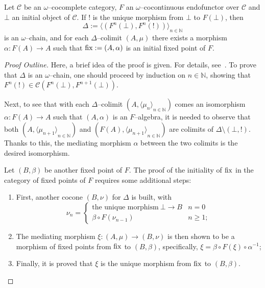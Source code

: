 \begin{thm}\label{thm:init}
  Let \(\mathcal{C}\) be an \(\omega\)--cocomplete category, \(F\) an \(\omega{}\)--cocontinuous endofunctor over \(\mathcal{C}\) and \(\bot{}\) an initial object of \(\mathcal{C}\). %
  If \(!{}\) is the unique morphism from \(\bot{}\) to \(F(\bot{})\), then
  \begin{equation}
    \Delta := {\langle(F^n(\bot),F^n(!))\rangle}_{n \in \mathbb{N}}
  \end{equation}
  is an \(\omega{}\)--chain, and for each \(\Delta\)--colimit \((A,\mu)\) there exists a morphism \(\alpha \colon F(A) \to A\) such that \(\operatorname{fix} := (A,\alpha)\) is an initial fixed point of \(F\). %
\end{thm}
\begin{proof}[Proof Outline]
  Here, a brief idea of the proof is given. For details, see~\cite{Hemerik1988}.
  To prove that \(\Delta{}\) is an \(\omega{}\)--chain, one should proceed by induction on \(n \in \mathbb{N}\), showing that \(F^n(!) \in \mathcal{C}(F^n(\bot),F^{n+1}(\bot))\).

  Next, to see that with each \(\Delta\)--colimit \((A,{\langle\mu_n \rangle}_{n\in\mathbb{N}})\) comes an isomorphism \(\alpha \colon F(A) \to A\) such that \((A,\alpha)\) is an \(F\)--algebra, it is needed to observe that both \((A,{\langle \mu_{n+1} \rangle}_{n\in\mathbb{N}})\) and \((F(A),{\langle\mu_{n+1} \rangle}_{n\in\mathbb{N}})\) are colimits of \(\Delta \setminus (\bot,!)\).
  Thanks to this, the mediating morphism \(\alpha{}\) between the two colimits is the desired isomorphism.

  Let \((B,\beta)\) be another fixed point of \(F\). The proof of the initiality of \(\operatorname{fix}\) in the category of fixed points of \(F\) requires some additional steps:
  \begin{enumerate}
    \item First, another cocone \((B,\nu)\) for \(\Delta{}\) is built, with
    \begin{equation*}
      \nu_n =
      \begin{cases}
        \text{the unique morphism}\: \bot \to B & n = 0 \\
        \beta \circ F(\nu_{n-1}) & n \ge 1;
      \end{cases}
    \end{equation*}
    \item The mediating morphism \(\xi \colon (A,\mu) \to (B, \nu)\) is then shown to be a morphism of fixed points from \(\operatorname{fix}\) to \((B,\beta)\), specifically, \(\xi = \beta \circ F(\xi) \circ \alpha^{-1}\);
    \item Finally, it is proved that \(\xi{}\) is the unique morphism from \(\operatorname{fix}\) to \((B,\beta)\).
  \end{enumerate}
\end{proof}
